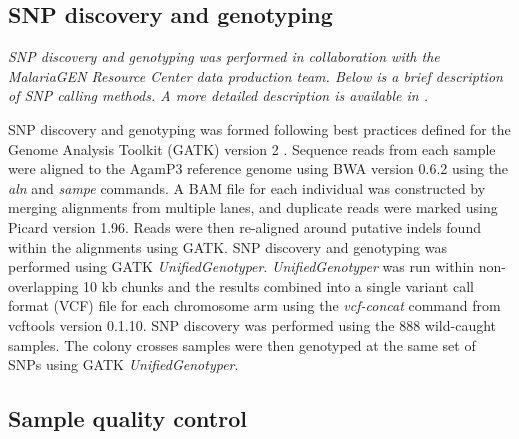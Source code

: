 \documentclass[a4paper,11pt,abstracton,hidelinks]{scrartcl}
\begin{document}
\subsection{SNP discovery and genotyping}


\textit{SNP discovery and genotyping was performed in collaboration with the MalariaGEN Resource Center data production team. Below is a brief description of SNP calling methods. A more detailed description is available in \citet{Ag1000G2017}.}


SNP discovery and genotyping was formed following best practices defined for the Genome Analysis Toolkit (GATK) version 2 \citep{McKenna2010,Depristo2011,VanderAuwera2013}.
%
Sequence reads from each sample were aligned to the AgamP3 reference genome \citep{Holt2002,Sharakhova2007} using BWA version 0.6.2 \citep{Li2009} using the \textit{aln} and \textit{sampe} commands.
%
A BAM file for each individual was constructed by merging alignments from multiple lanes, and duplicate reads were marked using Picard version 1.96.
%
Reads were then re-aligned around putative indels found within the alignments using GATK.
%
SNP discovery and genotyping was performed using GATK \textit{UnifiedGenotyper}.
%
\textit{UnifiedGenotyper} was run within non-overlapping 10 kb chunks and the results combined into a single variant call format (VCF) file for each chromosome arm using the \textit{vcf-concat} command from vcftools version 0.1.10.
%
SNP discovery was performed using the 888 wild-caught samples.
%
The colony crosses samples were then genotyped at the same set of SNPs using GATK \textit{UnifiedGenotyper}.


\subsection{Sample quality control}
\end{document}
